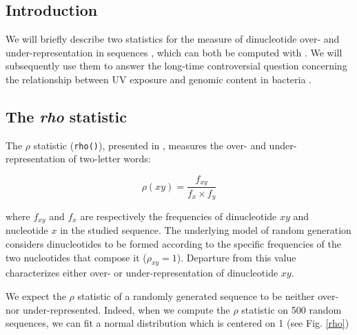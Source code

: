 \documentclass{article}
\begin{document}
\subsection{Introduction}

We will briefly describe two statistics for the measure of
dinucleotide over- and under-representation in sequences
\cite{Karlin,UV}, which can both be computed with \seqinr{}. We will
subsequently use them to answer the long-time controversial question
concerning the relationship between UV exposure and genomic content in
bacteria \cite{Singer,Bak}.

\subsection{The \textit{rho} statistic}

The $\rho$ statistic (\texttt{rho()}), presented in \cite{Karlin},
measures the over- and under-representation of two-letter words:

$$\rho(xy) = \frac{f_{xy}}{f_{x}\times f_{y}}$$

where $f_{xy}$ and $f_{x}$ are respectively the frequencies of
dinucleotide $xy$ and nucleotide $x$ in the studied sequence. The
underlying model of random generation considers dinucleotides to be
formed according to the specific frequencies of the two nucleotides
that compose it ($\rho_{xy} = 1$). Departure from this value
characterizes either over- or under-representation of dinucleotide
$xy$.


We expect the $\rho$ statistic of a randomly generated sequence to be
neither over- nor under-represented. Indeed, when we compute the
$\rho$ statistic on 500 random
sequences, we can fit a normal distribution which is centered on 1
(see Fig. \ref{rho})

\begin{Schunk}
\end{Schunk}
\end{document}
